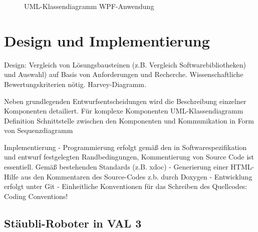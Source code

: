 \documentclass[ a4paper,
                oneside,
                toc=bibliography,
                toc=listof
                ]{scrbook}
\begin{document}
\begin{figure}
		\caption{UML-Klassendiagramm WPF-Anwendung}
		\label{fig:UMLKlassenWPF}
	\end{figure}
	
	\chapter{Design und Implementierung}
	Design: Vergleich von Lösungsbausteinen (z.B. Vergleich Softwarebibliotheken) und Auswahl) auf Basis von Anforderungen und Recherche. Wissenschaftliche Bewertungskriterien nötig. Harvey-Diagramm.
	
	Neben grundlegenden Entwurfsentscheidungen wird die Beschreibung einzelner Komponenten detailiert. Für komplexe Komponenten UML-Klassendiagramm
	Definition Schnittstelle zwischen den Komponenten und Kommunikation in Form von Sequenzdiagramm
	
	
	Implementierung
	- Programmierung erfolgt gemäß den in Softwarespezifikation und entwurf festgelegten Randbedingungen, Kommentierung von Source Code ist essentiell. Gemäß bestehenden Standards (z.B. xdoc)
	- Generierung einer HTML-Hilfe aus den Kommentaren des Source-Codes z.b. durch Doxygen
	- Entwicklung erfolgt unter Git
	- Einheitliche Konventionen für das Schreiben des Quellcodes: Coding Conventions!
	\section{Stäubli-Roboter in VAL 3}
	
\end{document}
